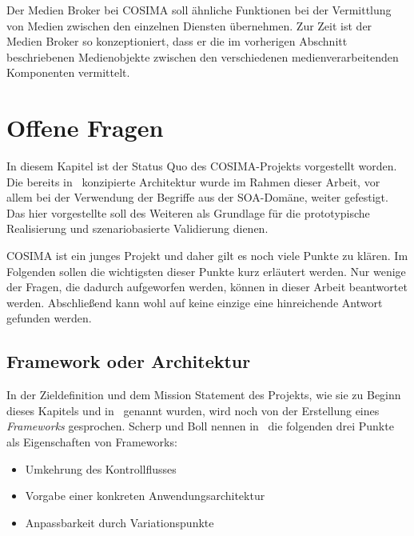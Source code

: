   Der Medien Broker bei COSIMA soll ähnliche Funktionen bei der Vermittlung von Medien zwischen den einzelnen Diensten übernehmen. Zur Zeit ist der Medien Broker so konzeptioniert, dass er die im vorherigen Abschnitt beschriebenen Medienobjekte zwischen den verschiedenen medienverarbeitenden Komponenten vermittelt.




\section{Offene Fragen} %
\label{sec:offene_fragen}

  In diesem Kapitel ist der Status Quo des COSIMA-Projekts vorgestellt worden. Die bereits in~\citep{bericht} konzipierte Architektur wurde im Rahmen dieser Arbeit, vor allem bei der Verwendung der Begriffe aus der SOA-Domäne, weiter gefestigt. Das hier vorgestellte soll des Weiteren als Grundlage für die prototypische Realisierung und szenariobasierte Validierung dienen.

  COSIMA ist ein junges Projekt und daher gilt es noch viele Punkte zu klären. Im Folgenden sollen die wichtigsten dieser Punkte kurz erläutert werden. Nur wenige der Fragen, die dadurch aufgeworfen werden, können in dieser Arbeit beantwortet werden. Abschließend kann wohl auf keine einzige eine hinreichende Antwort gefunden werden.
  
\subsection{Framework oder Architektur} %
\label{sub:framework_oder_architektur}

  In der Zieldefinition und dem Mission Statement des Projekts, wie sie zu Beginn dieses Kapitels und in~\citep{bericht} genannt wurden, wird noch von der Erstellung eines \emph{Frameworks} gesprochen. Scherp und Boll nennen in~\citep[S. 396f]{scherp2006fe} die folgenden drei Punkte als Eigenschaften von Frameworks:
  
  \begin{itemize}
    \item Umkehrung des Kontrollflusses
    \item Vorgabe einer konkreten Anwendungsarchitektur
    \item Anpassbarkeit durch Variationspunkte
  \end{itemize}
  
